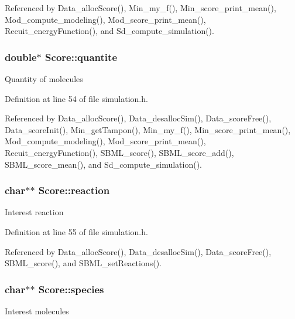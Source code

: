 Referenced by Data\_\-allocScore(), Min\_\-my\_\-f(), Min\_\-score\_\-print\_\-mean(), Mod\_\-compute\_\-modeling(), Mod\_\-score\_\-print\_\-mean(), Recuit\_\-energyFunction(), and Sd\_\-compute\_\-simulation().

\hypertarget{structScore_aadd3a70f5dc0018739a48ff13cb9fa2d}{
\subsubsection[{quantite}]{\setlength{\rightskip}{0pt plus 5cm}double$\ast$ {\bf Score::quantite}}}
\label{structScore_aadd3a70f5dc0018739a48ff13cb9fa2d}
Quantity of molecules 

Definition at line 54 of file simulation.h.



Referenced by Data\_\-allocScore(), Data\_\-desallocSim(), Data\_\-scoreFree(), Data\_\-scoreInit(), Min\_\-getTampon(), Min\_\-my\_\-f(), Min\_\-score\_\-print\_\-mean(), Mod\_\-compute\_\-modeling(), Mod\_\-score\_\-print\_\-mean(), Recuit\_\-energyFunction(), SBML\_\-score(), SBML\_\-score\_\-add(), SBML\_\-score\_\-mean(), and Sd\_\-compute\_\-simulation().

\hypertarget{structScore_af8245823c6e659cee49999dd3452a301}{
\subsubsection[{reaction}]{\setlength{\rightskip}{0pt plus 5cm}char$\ast$$\ast$ {\bf Score::reaction}}}
\label{structScore_af8245823c6e659cee49999dd3452a301}
Interest reaction 

Definition at line 55 of file simulation.h.



Referenced by Data\_\-allocScore(), Data\_\-desallocSim(), Data\_\-scoreFree(), SBML\_\-score(), and SBML\_\-setReactions().

\hypertarget{structScore_ae22017a9e14dbbacbc7ef1a41f880ceb}{
\subsubsection[{species}]{\setlength{\rightskip}{0pt plus 5cm}char$\ast$$\ast$ {\bf Score::species}}}
\label{structScore_ae22017a9e14dbbacbc7ef1a41f880ceb}
Interest molecules 

